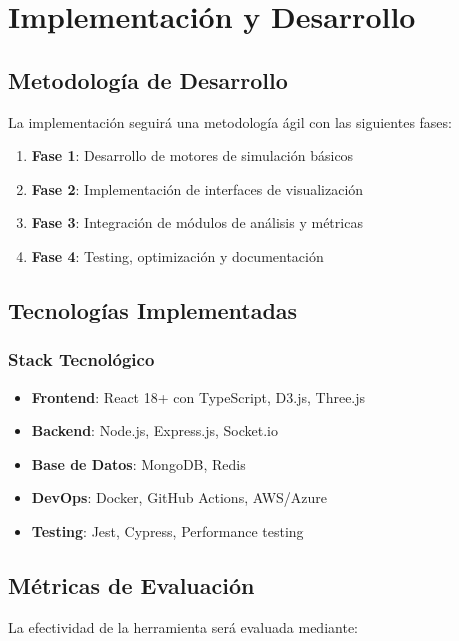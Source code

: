 \section{Implementación y Desarrollo}

\subsection{Metodología de Desarrollo}

La implementación seguirá una metodología ágil con las siguientes fases:

\begin{enumerate}
    \item \textbf{Fase 1}: Desarrollo de motores de simulación básicos
    \item \textbf{Fase 2}: Implementación de interfaces de visualización
    \item \textbf{Fase 3}: Integración de módulos de análisis y métricas
    \item \textbf{Fase 4}: Testing, optimización y documentación
\end{enumerate}

\subsection{Tecnologías Implementadas}

\subsubsection{Stack Tecnológico}

\begin{itemize}
    \item \textbf{Frontend}: React 18+ con TypeScript, D3.js, Three.js
    \item \textbf{Backend}: Node.js, Express.js, Socket.io
    \item \textbf{Base de Datos}: MongoDB, Redis
    \item \textbf{DevOps}: Docker, GitHub Actions, AWS/Azure
    \item \textbf{Testing}: Jest, Cypress, Performance testing
\end{itemize}

\subsection{Métricas de Evaluación}

La efectividad de la herramienta será evaluada mediante:


